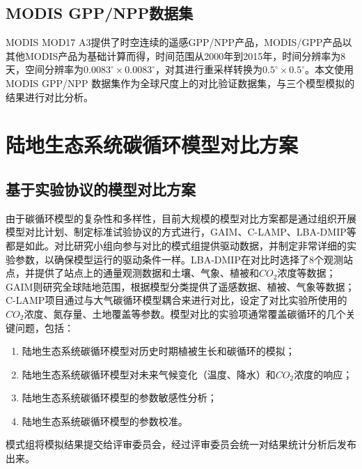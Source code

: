 \subsection{MODIS GPP/NPP数据集}
MODIS MOD17 A3提供了时空连续的遥感GPP/NPP产品，MODIS/GPP产品以其他MODIS产品为基础计算而得，时间范围从2000年到2015年，时间分辨率为8天，空间分辨率为$0.0083^{\circ} \times 0.0083^{\circ}$，对其进行重采样转换为$0.5^{\circ} \times 0.5^{\circ}$。本文使用MODIS GPP/NPP 数据集作为全球尺度上的对比验证数据集，与三个模型模拟的结果进行对比分析。


\section{陆地生态系统碳循环模型对比方案}
\label{sec:cmp-sln-analysis}
\subsection{基于实验协议的模型对比方案}
由于碳循环模型的复杂性和多样性，目前大规模的模型对比方案都是通过组织开展模型对比计划、制定标准试验协议的方式进行，GAIM、C-LAMP、LBA-DMIP等都是如此。对比研究小组向参与对比的模式组提供驱动数据，并制定非常详细的实验参数，以确保模型运行的驱动条件一样。LBA-DMIP在对比时选择了8个观测站点，并提供了站点上的通量观测数据和土壤、气象、植被和$CO_2$浓度等数据；GAIM则研究全球陆地范围，根据模型分类提供了遥感数据、植被、气象等数据；C-LAMP项目通过与大气碳循环模型耦合来进行对比，设定了对比实验所使用的$CO_2$浓度、氮存量、土地覆盖等参数。模型对比的实验项通常覆盖碳循环的几个关键问题，包括：

\begin{enumerate}[(1)]
\item 陆地生态系统碳循环模型对历史时期植被生长和碳循环的模拟；
\item 陆地生态系统碳循环模型对未来气候变化（温度、降水）和$CO_2$浓度的响应；
\item 陆地生态系统碳循环模型的参数敏感性分析；
\item 陆地生态系统碳循环模型的参数校准。
\end{enumerate}

模式组将模拟结果提交给评审委员会，经过评审委员会统一对结果统计分析后发布出来。

